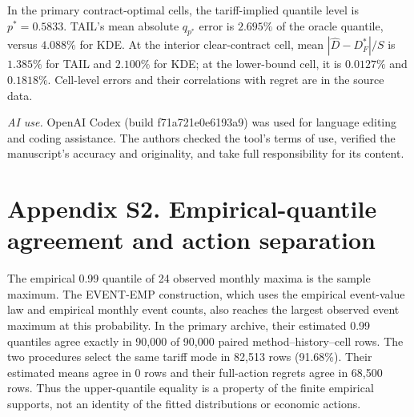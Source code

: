 \documentclass[]{interact}
\begin{document}

\FloatBarrier


\FloatBarrier


\FloatBarrier


\FloatBarrier


\FloatBarrier


\FloatBarrier


\FloatBarrier


\FloatBarrier


\FloatBarrier



\FloatBarrier


\FloatBarrier


\FloatBarrier
In the primary contract-optimal cells, the tariff-implied quantile
level is $p^*=0.5833$. TAIL's mean absolute $q_{p^*}$ error is
$2.695\%$ of the oracle quantile, versus $4.088\%$ for KDE. At the
interior clear-contract cell, mean $|\widehat D-D_F^*|/S$ is
$1.385\%$ for TAIL and $2.100\%$ for KDE; at the lower-bound cell,
it is $0.0127\%$ and $0.1818\%$. Cell-level errors and their
correlations with regret are in the source data.


\FloatBarrier

\FloatBarrier

\FloatBarrier

\FloatBarrier

\noindent\textit{AI use.} OpenAI Codex (build f71a721e0e6193a9) was used for language editing and coding assistance. The authors checked the tool's terms of use, verified the manuscript's accuracy and originality, and take full responsibility for its content.


\section*{Appendix S2. Empirical-quantile agreement and action separation}

The empirical 0.99 quantile of 24 observed monthly maxima is the
sample maximum. The EVENT-EMP construction, which uses the empirical
event-value law and empirical monthly event counts, also reaches the
largest observed event maximum at this probability. In the primary
archive, their estimated 0.99 quantiles agree exactly in
90,000 of 90,000
paired method--history--cell rows. The two procedures select the same
tariff mode in 82,513 rows
(91.68\%). Their estimated means
agree in 0 rows and their full-action regrets
agree in 68,500 rows. Thus the upper-quantile
equality is a property of the finite empirical supports, not an
identity of the fitted distributions or economic actions.
\end{document}
